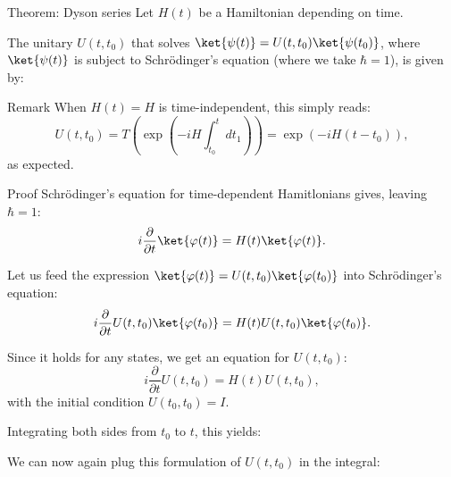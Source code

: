 \documentclass[a4paper]{article}
\begin{document}
\begin{parag}{Theorem: Dyson series}
    Let $H\left(t\right)$ be a Hamiltonian depending on time.

    The unitary $U\left(t, t_0\right)$ that solves $\ket{\psi\left(t\right)} = U\left(t, t_0\right) \ket{\psi\left(t_0\right)}$, where $\ket{\psi\left(t\right)}$ is subject to Schrödinger's equation (where we take $\hbar = 1$), is given by:

    \begin{subparag}{Remark}
        When $H\left(t\right) = H$ is time-independent, this simply reads: 
        \[U\left(t, t_0\right) = T\left(\exp\left(-i H \int_{t_0}^{t} dt_1\right)\right) = \exp\left(-i H \left(t - t_0\right)\right),\]
        as expected.
    \end{subparag}

    \begin{subparag}{Proof}
        Schrödinger's equation for time-dependent Hamitlonians gives, leaving $\hbar = 1$: 
        \[i \frac{\partial}{\partial t} \ket{\phi\left(t\right)} = H\left(t\right) \ket{\phi\left(t\right)}.\]

        Let us feed the expression $\ket{\phi\left(t\right)} = U\left(t, t_0\right) \ket{\phi\left(t_0\right)}$ into Schrödinger's equation: 
        \[i \frac{\partial}{\partial t} U\left(t, t_0\right) \ket{\phi\left(t_0\right)} = H\left(t\right) U\left(t, t_0\right) \ket{\phi\left(t_0\right)}.\]

        Since it holds for any states, we get an equation for $U\left(t, t_0\right)$: 
        \[i \frac{\partial }{\partial t} U\left(t, t_0\right) = H\left(t\right) U\left(t, t_0\right),\]
        with the initial condition $U\left(t_0, t_0\right) = I$.
        
        Integrating both sides from $t_0$ to $t$, this yields: 

        We can now again plug this formulation of $U\left(t, t_0\right)$ in the integral: 


\end{subparag}
\end{parag}
\end{document}
